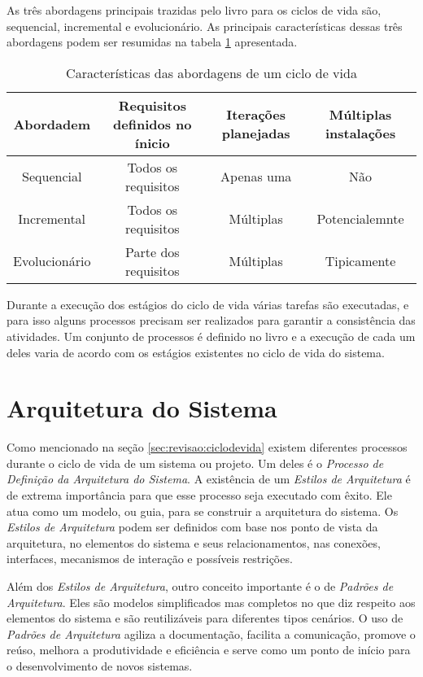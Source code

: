 	As três abordagens principais trazidas pelo livro para os ciclos de vida são, sequencial, incremental e evolucionário. As principais características dessas três abordagens
	podem ser resumidas na tabela \ref{tab:revisao:ciclodevida:abordagens} apresentada.

	\begin{table}[!h]
		\centering
		\caption{Características das abordagens de um ciclo de vida}
		\begin{tabular}{cccc}
			\hline
			Abordadem & Requisitos definidos no ínicio & Iterações planejadas & Múltiplas instalações \\
			\hline
			Sequencial & Todos os requisitos & Apenas uma & Não\\
			Incremental & Todos os requisitos & Múltiplas & Potencialemnte\\
			Evolucionário & Parte dos requisitos & Múltiplas & Tipicamente\\
			\hline
		\end{tabular}
		\label{tab:revisao:ciclodevida:abordagens}
	\end{table}

	Durante a execução dos estágios do ciclo de vida várias tarefas são executadas, e para isso alguns processos precisam ser realizados para garantir a consistência das atividades. Um conjunto
	de processos é definido no livro e a execução de cada um deles varia de acordo com os estágios existentes no ciclo de vida do sistema.
	
	\section{Arquitetura do Sistema}\label{sec:revisao:arqSistema}

	Como mencionado na seção \ref{sec:revisao:ciclodevida} existem diferentes processos durante o ciclo de vida de um sistema ou projeto. Um deles é o 
	\textit{Processo de Definição da Arquitetura do Sistema}. A existência de um  \textit{Estilos de Arquitetura} é de extrema importância para que esse processo seja executado com êxito. Ele
	atua como um modelo, ou guia, para se construir a arquitetura do sistema. Os \textit{Estilos de Arquitetura} podem ser definidos com base nos ponto de vista da arquitetura, no elementos do
	sistema e seus relacionamentos, nas conexões, interfaces, mecanismos de interação e possíveis restrições.
	
	Além dos \textit{Estilos de Arquitetura}, outro conceito importante é o de \textit{Padrões de Arquitetura}. Eles são modelos simplificados mas completos no que diz respeito aos elementos do
	sistema e são reutilizáveis para diferentes tipos cenários. O uso de \textit{Padrões de Arquitetura} agiliza  a documentação, facilita a comunicação, promove o reúso, melhora a produtividade
	e eficiência e serve como um ponto de início para o desenvolvimento de novos sistemas.

